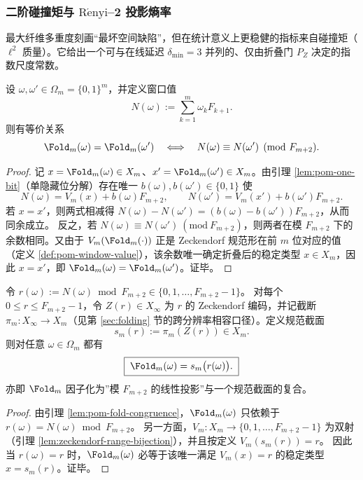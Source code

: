 \subsubsection{二阶碰撞矩与 \texorpdfstring{$\mathrm{R\acute{e}nyi}$}{Renyi}--2 投影熵率}\label{subsec:pom-s2}
最大纤维多重度刻画“最坏空间缺陷”，但在统计意义上更稳健的指标来自碰撞矩（\(\ell^2\) 质量）。它给出一个可与在线延迟 \(\delta_{\min}=3\) 并列的、仅由折叠门 \(P_Z\) 决定的指数尺度常数。

\begin{lemma}\label{lem:pom-fold-congruence}
设 \(\omega,\omega'\in\Omega_m=\{0,1\}^m\)，并定义窗口值
$$
N(\omega):=\sum_{k=1}^m \omega_k F_{k+1}.
$$
则有等价关系
$$
\Fold_m(\omega)=\Fold_m(\omega')
\quad\Longleftrightarrow\quad
N(\omega)\equiv N(\omega')\pmod{F_{m+2}}.
$$
\end{lemma}
\begin{proof}
记 \(x=\Fold_m(\omega)\in X_m\)、\(x'=\Fold_m(\omega')\in X_m\)。由引理 \ref{lem:pom-one-bit}（单隐藏位分解）存在唯一 \(b(\omega),b(\omega')\in\{0,1\}\) 使
$$
N(\omega)=V_m(x)+b(\omega)F_{m+2},\qquad
N(\omega')=V_m(x')+b(\omega')F_{m+2}.
$$
若 \(x=x'\)，则两式相减得 \(N(\omega)-N(\omega')=(b(\omega)-b(\omega'))F_{m+2}\)，从而同余成立。
反之，若 \(N(\omega)\equiv N(\omega')\ (\mathrm{mod}\ F_{m+2})\)，则两者在模 \(F_{m+2}\) 下的余数相同。又由于 \(V_m(\Fold_m(\cdot))\) 正是 Zeckendorf 规范形在前 \(m\) 位对应的值（定义 \ref{def:pom-window-value}），该余数唯一确定折叠后的稳定类型 \(x\in X_m\)，因此 \(x=x'\)，即 \(\Fold_m(\omega)=\Fold_m(\omega')\)。证毕。
\end{proof}

\begin{proposition}[折叠作为模同余投影的规范截面]\label{prop:pom-fold-as-section}
令 \(r(\omega):=N(\omega)\bmod F_{m+2}\in\{0,1,\dots,F_{m+2}-1\}\)。
对每个 \(0\le r\le F_{m+2}-1\)，令 \(Z(r)\in X_\infty\) 为 \(r\) 的 Zeckendorf 编码，并记截断 \(\pi_m: X_\infty\to X_m\)（见第 \ref{sec:folding} 节的跨分辨率相容口径）。定义规范截面
\[
s_m(r):=\pi_m(Z(r))\in X_m.
\]
则对任意 \(\omega\in\Omega_m\) 都有
\[
\boxed{\;\Fold_m(\omega)=s_m\bigl(r(\omega)\bigr).\;}
\]
亦即 \(\Fold_m\) 因子化为”模 \(F_{m+2}\) 的线性投影”与一个规范截面的复合。
\end{proposition}
\begin{proof}
由引理 \ref{lem:pom-fold-congruence}，\(\Fold_m(\omega)\) 只依赖于 \(r(\omega)=N(\omega)\bmod F_{m+2}\)。
另一方面，\(V_m:X_m\to\{0,1,\dots,F_{m+2}-1\}\) 为双射（引理 \ref{lem:zeckendorf-range-bijection}），并且按定义 \(V_m(s_m(r))=r\)。
因此当 \(r(\omega)=r\) 时，\(\Fold_m(\omega)\) 必等于该唯一满足 \(V_m(x)=r\) 的稳定类型 \(x=s_m(r)\)。证毕。
\end{proof}

